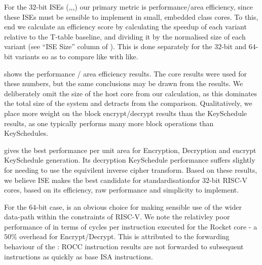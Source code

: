 
For the $32$-bit ISEs 
(,,,)
our primary metric is
performance/area efficiency, since these ISEs must be sensible to
implement in small, embedded class cores.
To this, end we calculate an efficiency score by calculating the speedup
of each variant relative to the T-table baseline, and dividing it
by the normalised size of each variant
(see ``ISE Size'' column of ).
This is done separately for the $32$-bit and $64$-bit variants so as
to compare like with like.

 shows the performance / area efficiency results.
The  core results were used for these numbers, but the
same conclusions may be drawn from the  results.
We deliberately omit the size of the host core from our calculation,
as this dominates the total size of the system and detracts from
the comparison.
Qualitatively, we place more weight on the block encrypt/decrypt results
than the KeySchedule results, as one typically performs many more
block operations than KeySchedules.

 gives the best performance per unit area
for Encryption, Decryption and encrypt KeySchedule generation.
Its decryption KeySchedule performance suffers slightly for needing
to use the equivilent inverse cipher transform.
Based on these results, we believe ISE  makes the best candidate for
standardisationfor $32$-bit RISC-V cores,
based on its efficiency, raw performance and simplicity to implement.

For the $64$-bit case,  is an obvious choice for making
sensible use of the wider data-path within the constraints of RISC-V.
We note the relativley poor performance of  in terms of cycles
per instruction executed for the Rocket core - a $50\%$ overhead for
Encrypt/Decrypt.
This is attributed to the forwarding behaviour of the :
ROCC instruction results are not
forwarded to subsequent instructions as quickly as base ISA
instructions.

